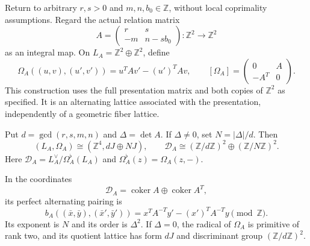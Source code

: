 \documentclass[11pt]{article}
\numberwithin{equation}{section}
\begin{document}
Return to arbitrary $r,s>0$ and $m,n,b_0\in\mathbb Z$, without
local coprimality assumptions.  Regard the actual relation matrix
\[
 A=\begin{pmatrix}r&s\\-m&n-sb_0\end{pmatrix}:\mathbb Z^2\to\mathbb Z^2
\]
as an integral map.  On $L_A=\mathbb Z^2\oplus\mathbb Z^2$, define
\begin{equation}\label{eq:doubled-form}
 \Omega_A((u,v),(u',v'))=u^TAv'-(u')^TAv,\qquad
 [\Omega_A]=\begin{pmatrix}0&A\\-A^T&0\end{pmatrix}.
\end{equation}
This construction uses the full presentation matrix and both copies of
$\mathbb Z^2$ as specified.  It is an alternating lattice associated
with the presentation, independently of a geometric fiber lattice.

\begin{theorem}\label{thm:double}
Put $d=\gcd(r,s,m,n)$ and $\Delta=\det A$.
If $\Delta\ne0$, set $N=|\Delta|/d$.  Then
\[
 (L_A,\Omega_A)\cong (\mathbb Z^4,dJ\oplus NJ),\qquad
 \mathcal D_A\cong(\mathbb Z/d\mathbb Z)^2
                    \oplus(\mathbb Z/N\mathbb Z)^2.
\]
Here $\mathcal D_A=L_A^\vee/\Omega_A^\flat(L_A)$ and
$\Omega_A^\flat(z)=\Omega_A(z,-)$.

In the coordinates
\[
 \mathcal D_A=\operatorname{coker}A\oplus\operatorname{coker}A^T,
\]
its perfect alternating pairing is
\begin{equation}\label{eq:arithmetic-pairing}
 b_A((\bar x,\bar y),(\bar x',\bar y'))
     =x^TA^{-T}y'-(x')^TA^{-T}y\pmod{\mathbb Z}.
\end{equation}
Its exponent is $N$ and its order is $\Delta^2$.
If $\Delta=0$, the radical of $\Omega_A$ is primitive of rank two,
and its quotient lattice has form $dJ$ and discriminant group
$(\mathbb Z/d\mathbb Z)^2$.
\end{theorem}
\end{document}
